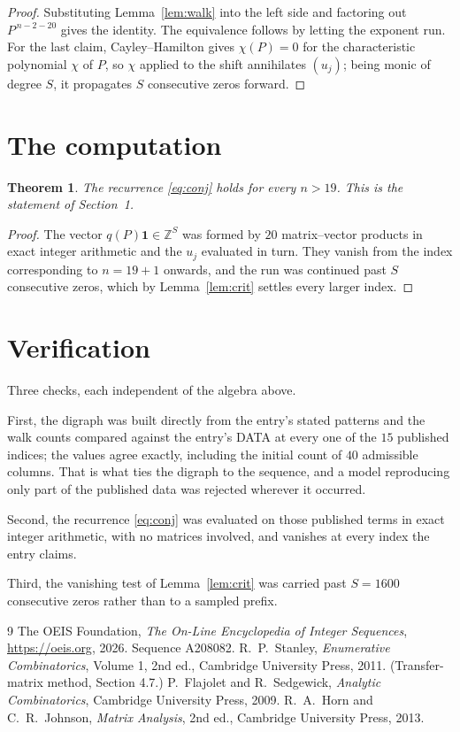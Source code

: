 \documentclass[11pt,a4paper]{article}
\theoremstyle{plain}
\newtheorem{theorem}{Theorem}
\theoremstyle{definition}
\begin{document}
\begin{proof}
Substituting Lemma~\ref{lem:walk} into the left side and factoring out
$P^{\,n-2-20}$ gives the identity. The equivalence follows by letting the exponent
run. For the last claim, Cayley--Hamilton gives $\chi(P)=0$ for the characteristic
polynomial $\chi$ of $P$, so $\chi$ applied to the shift annihilates $(u_j)$; being monic of
degree $S$, it propagates $S$ consecutive zeros forward.
\end{proof}

\section{The computation}

\begin{theorem}
The recurrence \eqref{eq:conj} holds for every $n>19$. This is the statement of
Section~1.
\end{theorem}

\begin{proof}
The vector $q(P)\mathbf{1}\in\mathbb{Z}^{S}$ was formed by $20$ matrix--vector
products in exact integer arithmetic and the $u_j$ evaluated in turn. They vanish from the
index corresponding to $n=19+1$ onwards, and the run was continued past $S$ consecutive
zeros, which by Lemma~\ref{lem:crit} settles every larger index.
\end{proof}

\section{Verification}

Three checks, each independent of the algebra above.

First, the digraph was built directly from the entry's stated patterns and the walk counts
compared against the entry's DATA at every one of the $15$ published indices; the
values agree exactly, including the initial count of $40$ admissible columns. That is
what ties the digraph to the sequence, and a model reproducing only part of the published
data was rejected wherever it occurred.

Second, the recurrence \eqref{eq:conj} was evaluated on those published terms in exact
integer arithmetic, with no matrices involved, and vanishes at every index the entry claims.

Third, the vanishing test of Lemma~\ref{lem:crit} was carried past $S=1600$ consecutive
zeros rather than to a sampled prefix.

\begin{thebibliography}{9}
 The OEIS Foundation, \emph{The On-Line Encyclopedia of Integer
Sequences}, \url{https://oeis.org}, 2026. Sequence A208082.
 R.~P.~Stanley, \emph{Enumerative Combinatorics}, Volume 1, 2nd ed.,
Cambridge University Press, 2011. (Transfer-matrix method, Section 4.7.)
 P.~Flajolet and R.~Sedgewick, \emph{Analytic Combinatorics}, Cambridge
University Press, 2009.
 R.~A.~Horn and C.~R.~Johnson, \emph{Matrix Analysis}, 2nd ed., Cambridge
University Press, 2013.
\end{thebibliography}
\end{document}
